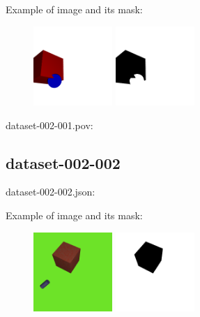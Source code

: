 Example of image and its mask:
\begin{center}
\begin{figure}[H]
\centering\includegraphics[width=3cm]{./img-002-001.png}
\centering\includegraphics[width=3cm]{./mask-002-001.png}
\end{figure}
\end{center}

dataset-002-001.pov:
\begin{scriptsize}
\begin{ttfamily}

\end{ttfamily}
\end{scriptsize}

\subsection{dataset-002-002}

dataset-002-002.json:
\begin{scriptsize}
\begin{ttfamily}

\end{ttfamily}
\end{scriptsize}

Example of image and its mask:
\begin{center}
\begin{figure}[H]
\centering\includegraphics[width=3cm]{./img-002-002.png}
\centering\includegraphics[width=3cm]{./mask-002-002.png}
\end{figure}
\end{center}

